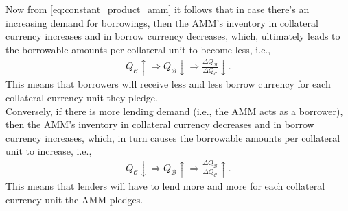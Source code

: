 \documentclass[a4paper]{article}
\begin{document}

Now from \cref{eq:constant_product_amm} it follows that in case there's an increasing demand for borrowings, then the AMM's inventory in collateral currency increases and in borrow currency decreases, which, ultimately leads to the borrowable amounts per collateral unit to become less, i.e., 
\begin{equation}
\label{eq:more_borrowing_strike}
\begin{split}
Q_{\mathcal{C}}\uparrow \Rightarrow Q_{\mathcal{B}}\downarrow \Rightarrow \frac{\Delta Q_{\mathcal{B}}}{\Delta Q_{\mathcal{C}}} \downarrow.
\end{split}
\end{equation}
This means that borrowers will receive less and less borrow currency for each collateral currency unit they pledge.\\

Conversely, if there is more lending demand (i.e., the AMM acts as a borrower), then the AMM's inventory in collateral currency decreases and in borrow currency increases, which, in turn causes the borrowable amounts per collateral unit to increase, i.e.,
\begin{equation}
\label{eq:more_lending_strike}
\begin{split}
Q_{\mathcal{C}}\downarrow \Rightarrow Q_{\mathcal{B}} \uparrow \Rightarrow \frac{\Delta Q_{\mathcal{B}}}{\Delta Q_{\mathcal{C}}} \uparrow.
\end{split}
\end{equation}
This means that lenders will have to lend more and more for each collateral currency unit the AMM pledges.
\end{document}
